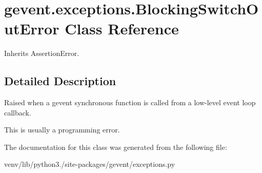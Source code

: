\hypertarget{classgevent_1_1exceptions_1_1_blocking_switch_out_error}{}\section{gevent.\+exceptions.\+Blocking\+Switch\+Out\+Error Class Reference}
\label{classgevent_1_1exceptions_1_1_blocking_switch_out_error}


Inherits Assertion\+Error.



\subsection{Detailed Description}
\begin{DoxyVerb}Raised when a gevent synchronous function is called from a
low-level event loop callback.

This is usually a programming error.
\end{DoxyVerb}
 

The documentation for this class was generated from the following file\+:\begin{DoxyCompactItemize}
\item 
venv/lib/python3./site-\/packages/gevent/exceptions.\+py\end{DoxyCompactItemize}
